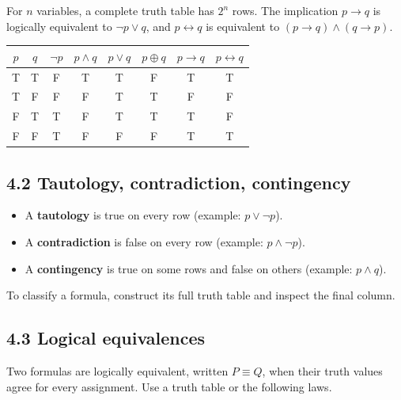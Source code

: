 \documentclass[11pt,a4paper]{article}
\begin{document}
For $n$ variables, a complete truth table has $2^n$ rows. The implication $p\to q$ is logically equivalent to $\neg p\lor q$, and $p\leftrightarrow q$ is equivalent to $(p\to q)\land(q\to p)$.

\begin{center}\small
\begin{tabular}{cc|cccccc}
\toprule $p$&$q$&$\neg p$&$p\land q$&$p\lor q$&$p\oplus q$&$p\to q$&$p\leftrightarrow q$\\\midrule
T&T&F&T&T&F&T&T\\
T&F&F&F&T&T&F&F\\
F&T&T&F&T&T&T&F\\
F&F&T&F&F&F&T&T\\\bottomrule
\end{tabular}\end{center}

\subsection{4.2 Tautology, contradiction, contingency}
\begin{itemize}
\item A \textbf{tautology} is true on every row (example: $p\lor\neg p$).
\item A \textbf{contradiction} is false on every row (example: $p\land\neg p$).
\item A \textbf{contingency} is true on some rows and false on others (example: $p\land q$).
\end{itemize}
To classify a formula, construct its full truth table and inspect the final column.

\subsection{4.3 Logical equivalences}
Two formulas are logically equivalent, written $P\equiv Q$, when their truth values agree for every assignment. Use a truth table or the following laws.
\end{document}
